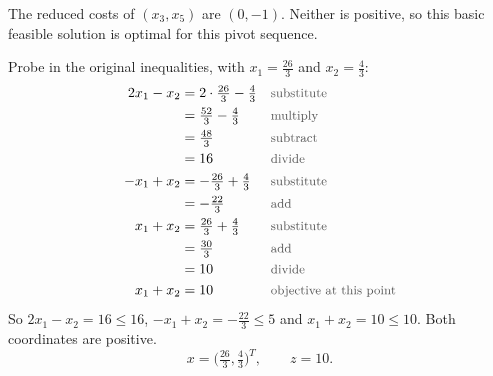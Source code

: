 \documentclass[a4paper,11pt]{article}
\newif\ifexplain
\newcommand{\why}[1]{\text{\small\color{black!65}#1}}
\newcommand{\explain}[1]{\ifexplain\begin{erklbox}#1\end{erklbox}\fi}
\begin{document}
The reduced costs of $(x_3,x_5)$ are $(0,-1)$. Neither is positive, so this basic feasible solution is optimal for this pivot sequence.
\explain{Im neuen Dictionary steht vor $x_5$ eine negative reduzierte Kosten und vor $x_3$ eine null. Erhöhen wir eine Nichtbasisvariable mit negativer reduzierter Kosten, fällt $z$. Eine null ändert $z$ nicht. Für den ersten Lauf ist das der Abbruch: kein positiver Eintrag mehr. Die null ist der Hinweis, dass noch eine zweite optimale Ecke existieren kann. Das prüfen wir im zweiten Teil und an der Grafik.}
Probe in the original inequalities, with $x_1=\tfrac{26}{3}$ and $x_2=\tfrac43$:
\begin{align*}
2x_1-x_2&=2\cdot\tfrac{26}{3}-\tfrac43&&\why{substitute}\\
&=\tfrac{52}{3}-\tfrac43&&\why{multiply}\\
&=\tfrac{48}{3}&&\why{subtract}\\
&=16&&\why{divide}\\
-x_1+x_2&=-\tfrac{26}{3}+\tfrac43&&\why{substitute}\\
&=-\tfrac{22}{3}&&\why{add}\\
x_1+x_2&=\tfrac{26}{3}+\tfrac43&&\why{substitute}\\
&=\tfrac{30}{3}&&\why{add}\\
&=10&&\why{divide}\\
x_1+x_2&=10&&\why{objective at this point}
\end{align*}
So $2x_1-x_2=16\leq 16$, $-x_1+x_2=-\tfrac{22}{3}\leq 5$ and $x_1+x_2=10\leq 10$. Both coordinates are positive.
\[\boxed{x=\bigl(\tfrac{26}{3},\tfrac43\bigr)^T,\qquad z=10.}\]
\explain{Die Probe setzt den Punkt in die ursprünglichen Ungleichungen ein, nicht nur ins letzte Dictionary. Zwei Nebenbedingungen sind aktiv, die mittlere nicht. Das passt zu den Schlupfwerten $x_3=0$, $x_5=0$ und $x_4=\tfrac{37}{3}$.}
\end{document}
